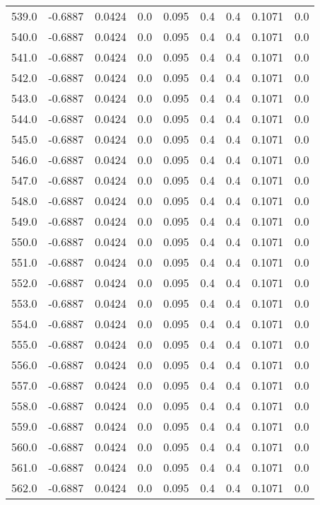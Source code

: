 \begin{longtable}{lrrrrrrrr}
539.0 & -0.6887 & 0.0424 & 0.0 & 0.095 & 0.4 & 0.4 & 0.1071 & 0.0 \\
540.0 & -0.6887 & 0.0424 & 0.0 & 0.095 & 0.4 & 0.4 & 0.1071 & 0.0 \\
541.0 & -0.6887 & 0.0424 & 0.0 & 0.095 & 0.4 & 0.4 & 0.1071 & 0.0 \\
542.0 & -0.6887 & 0.0424 & 0.0 & 0.095 & 0.4 & 0.4 & 0.1071 & 0.0 \\
543.0 & -0.6887 & 0.0424 & 0.0 & 0.095 & 0.4 & 0.4 & 0.1071 & 0.0 \\
544.0 & -0.6887 & 0.0424 & 0.0 & 0.095 & 0.4 & 0.4 & 0.1071 & 0.0 \\
545.0 & -0.6887 & 0.0424 & 0.0 & 0.095 & 0.4 & 0.4 & 0.1071 & 0.0 \\
546.0 & -0.6887 & 0.0424 & 0.0 & 0.095 & 0.4 & 0.4 & 0.1071 & 0.0 \\
547.0 & -0.6887 & 0.0424 & 0.0 & 0.095 & 0.4 & 0.4 & 0.1071 & 0.0 \\
548.0 & -0.6887 & 0.0424 & 0.0 & 0.095 & 0.4 & 0.4 & 0.1071 & 0.0 \\
549.0 & -0.6887 & 0.0424 & 0.0 & 0.095 & 0.4 & 0.4 & 0.1071 & 0.0 \\
550.0 & -0.6887 & 0.0424 & 0.0 & 0.095 & 0.4 & 0.4 & 0.1071 & 0.0 \\
551.0 & -0.6887 & 0.0424 & 0.0 & 0.095 & 0.4 & 0.4 & 0.1071 & 0.0 \\
552.0 & -0.6887 & 0.0424 & 0.0 & 0.095 & 0.4 & 0.4 & 0.1071 & 0.0 \\
553.0 & -0.6887 & 0.0424 & 0.0 & 0.095 & 0.4 & 0.4 & 0.1071 & 0.0 \\
554.0 & -0.6887 & 0.0424 & 0.0 & 0.095 & 0.4 & 0.4 & 0.1071 & 0.0 \\
555.0 & -0.6887 & 0.0424 & 0.0 & 0.095 & 0.4 & 0.4 & 0.1071 & 0.0 \\
556.0 & -0.6887 & 0.0424 & 0.0 & 0.095 & 0.4 & 0.4 & 0.1071 & 0.0 \\
557.0 & -0.6887 & 0.0424 & 0.0 & 0.095 & 0.4 & 0.4 & 0.1071 & 0.0 \\
558.0 & -0.6887 & 0.0424 & 0.0 & 0.095 & 0.4 & 0.4 & 0.1071 & 0.0 \\
559.0 & -0.6887 & 0.0424 & 0.0 & 0.095 & 0.4 & 0.4 & 0.1071 & 0.0 \\
560.0 & -0.6887 & 0.0424 & 0.0 & 0.095 & 0.4 & 0.4 & 0.1071 & 0.0 \\
561.0 & -0.6887 & 0.0424 & 0.0 & 0.095 & 0.4 & 0.4 & 0.1071 & 0.0 \\
562.0 & -0.6887 & 0.0424 & 0.0 & 0.095 & 0.4 & 0.4 & 0.1071 & 0.0 \\

\end{longtable}

